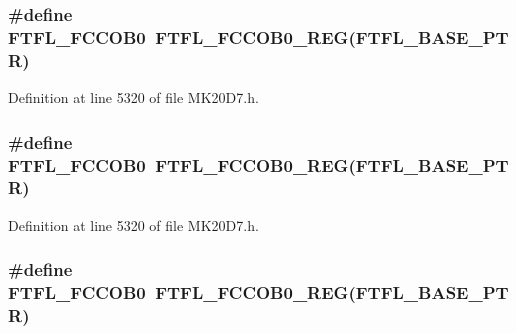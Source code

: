\subsubsection[{\texorpdfstring{F\+T\+F\+L\+\_\+\+F\+C\+C\+O\+B0}{FTFL_FCCOB0}}]{\setlength{\rightskip}{0pt plus 5cm}\#define F\+T\+F\+L\+\_\+\+F\+C\+C\+O\+B0~{\bf F\+T\+F\+L\+\_\+\+F\+C\+C\+O\+B0\+\_\+\+R\+EG}({\bf F\+T\+F\+L\+\_\+\+B\+A\+S\+E\+\_\+\+P\+TR})}\hypertarget{group___f_t_f_l___register___accessor___macros_ga565f766da2b8306ccf6d4cfa97f2d104}{}\label{group___f_t_f_l___register___accessor___macros_ga565f766da2b8306ccf6d4cfa97f2d104}


Definition at line 5320 of file M\+K20\+D7.\+h.

\subsubsection[{\texorpdfstring{F\+T\+F\+L\+\_\+\+F\+C\+C\+O\+B0}{FTFL_FCCOB0}}]{\setlength{\rightskip}{0pt plus 5cm}\#define F\+T\+F\+L\+\_\+\+F\+C\+C\+O\+B0~{\bf F\+T\+F\+L\+\_\+\+F\+C\+C\+O\+B0\+\_\+\+R\+EG}({\bf F\+T\+F\+L\+\_\+\+B\+A\+S\+E\+\_\+\+P\+TR})}\hypertarget{group___f_t_f_l___register___accessor___macros_ga565f766da2b8306ccf6d4cfa97f2d104}{}\label{group___f_t_f_l___register___accessor___macros_ga565f766da2b8306ccf6d4cfa97f2d104}


Definition at line 5320 of file M\+K20\+D7.\+h.

\subsubsection[{\texorpdfstring{F\+T\+F\+L\+\_\+\+F\+C\+C\+O\+B0}{FTFL_FCCOB0}}]{\setlength{\rightskip}{0pt plus 5cm}\#define F\+T\+F\+L\+\_\+\+F\+C\+C\+O\+B0~{\bf F\+T\+F\+L\+\_\+\+F\+C\+C\+O\+B0\+\_\+\+R\+EG}({\bf F\+T\+F\+L\+\_\+\+B\+A\+S\+E\+\_\+\+P\+TR})}\hypertarget{group___f_t_f_l___register___accessor___macros_ga565f766da2b8306ccf6d4cfa97f2d104}{}\label{group___f_t_f_l___register___accessor___macros_ga565f766da2b8306ccf6d4cfa97f2d104}



